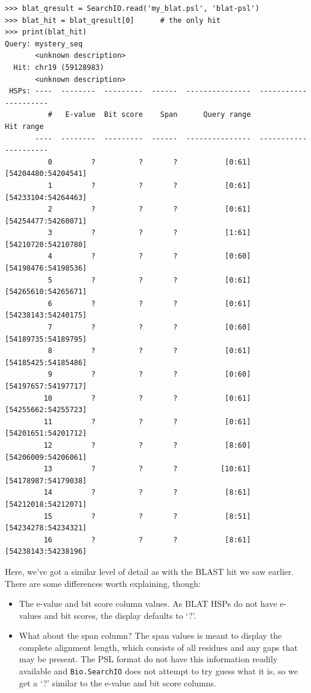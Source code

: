 \documentclass{report}
\begin{document}
\begin{verbatim}
>>> blat_qresult = SearchIO.read('my_blat.psl', 'blat-psl')
>>> blat_hit = blat_qresult[0]      # the only hit
>>> print(blat_hit)
Query: mystery_seq
       <unknown description>
  Hit: chr19 (59128983)
       <unknown description>
 HSPs: ----  --------  ---------  ------  ---------------  ---------------------
          #   E-value  Bit score    Span      Query range              Hit range
       ----  --------  ---------  ------  ---------------  ---------------------
          0         ?          ?       ?           [0:61]    [54204480:54204541]
          1         ?          ?       ?           [0:61]    [54233104:54264463]
          2         ?          ?       ?           [0:61]    [54254477:54260071]
          3         ?          ?       ?           [1:61]    [54210720:54210780]
          4         ?          ?       ?           [0:60]    [54198476:54198536]
          5         ?          ?       ?           [0:61]    [54265610:54265671]
          6         ?          ?       ?           [0:61]    [54238143:54240175]
          7         ?          ?       ?           [0:60]    [54189735:54189795]
          8         ?          ?       ?           [0:61]    [54185425:54185486]
          9         ?          ?       ?           [0:60]    [54197657:54197717]
         10         ?          ?       ?           [0:61]    [54255662:54255723]
         11         ?          ?       ?           [0:61]    [54201651:54201712]
         12         ?          ?       ?           [8:60]    [54206009:54206061]
         13         ?          ?       ?          [10:61]    [54178987:54179038]
         14         ?          ?       ?           [8:61]    [54212018:54212071]
         15         ?          ?       ?           [8:51]    [54234278:54234321]
         16         ?          ?       ?           [8:61]    [54238143:54238196]
\end{verbatim}

Here, we've got a similar level of detail as with the BLAST hit we saw earlier.
There are some differences worth explaining, though:

\begin{itemize}
\item The e-value and bit score column values. As BLAT HSPs do not have e-values
    and bit scores, the display defaults to `?'.
\item What about the span column? The span values is meant to display the
    complete alignment length, which consists of all residues and any gaps that
    may be present. The PSL format do not have this information readily available
    and \verb|Bio.SearchIO| does not attempt to try guess what it is, so we get a
    `?' similar to the e-value and bit score columns.
\end{itemize}
\end{document}

